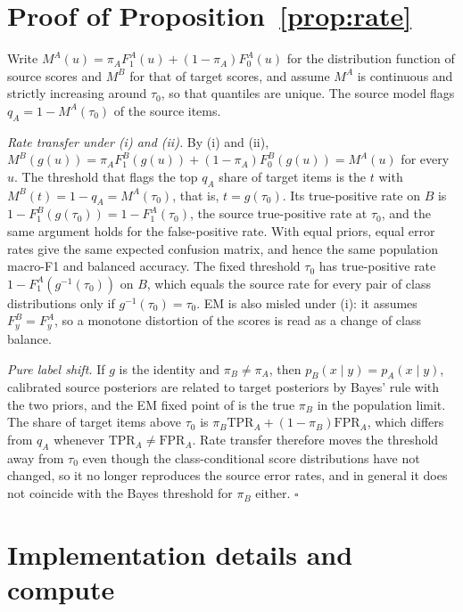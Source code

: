 \section{Proof of Proposition~\ref{prop:rate}}\label{app:proof}
Write $M^A(u)=\pi_A F^A_1(u)+(1-\pi_A)F^A_0(u)$ for the distribution function of source scores and $M^B$ for that of target scores, and assume $M^A$ is continuous and strictly increasing around $\tau_0$, so that quantiles are unique. The source model flags $q_A=1-M^A(\tau_0)$ of the source items.

\emph{Rate transfer under (i) and (ii).} By (i) and (ii), $M^B(g(u))=\pi_A F^B_1(g(u))+(1-\pi_A)F^B_0(g(u))=M^A(u)$ for every $u$. The threshold that flags the top $q_A$ share of target items is the $t$ with $M^B(t)=1-q_A=M^A(\tau_0)$, that is, $t=g(\tau_0)$. Its true-positive rate on $B$ is $1-F^B_1(g(\tau_0))=1-F^A_1(\tau_0)$, the source true-positive rate at $\tau_0$, and the same argument holds for the false-positive rate. With equal priors, equal error rates give the same expected confusion matrix, and hence the same population macro-F1 and balanced accuracy. The fixed threshold $\tau_0$ has true-positive rate $1-F^A_1(g^{-1}(\tau_0))$ on $B$, which equals the source rate for every pair of class distributions only if $g^{-1}(\tau_0)=\tau_0$. EM is also misled under (i): it assumes $F^B_y=F^A_y$, so a monotone distortion of the scores is read as a change of class balance.

\emph{Pure label shift.} If $g$ is the identity and $\pi_B\neq\pi_A$, then $p_B(x\mid y)=p_A(x\mid y)$, calibrated source posteriors are related to target posteriors by Bayes' rule with the two priors, and the EM fixed point of \citet{saerens2002adjusting} is the true $\pi_B$ in the population limit. The share of target items above $\tau_0$ is $\pi_B\mathrm{TPR}_A+(1-\pi_B)\mathrm{FPR}_A$, which differs from $q_A$ whenever $\mathrm{TPR}_A\neq\mathrm{FPR}_A$. Rate transfer therefore moves the threshold away from $\tau_0$ even though the class-conditional score distributions have not changed, so it no longer reproduces the source error rates, and in general it does not coincide with the Bayes threshold for $\pi_B$ either. $\square$

\section{Implementation details and compute}\label{app:impl}
